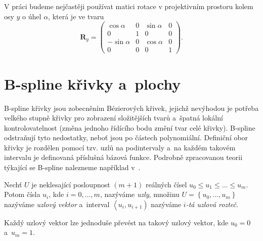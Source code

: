 \begin{poznamka}
	V práci budeme nejčastěji používat matici rotace v projektivním prostoru kolem osy $y$ o úhel $\alpha$, která je ve tvaru
	\begin{equation}\label{rotace}
		\mathbf{R}_y=
		\begin{pmatrix}
		\cos\alpha & 0 & \sin\alpha & 0 \\ 
		0 & 1 & 0 & 0 \\ 
		-\sin\alpha & 0 & \cos\alpha & 0 \\ 
		0 & 0 & 0 & 1
		\end{pmatrix}.
	\end{equation}
\end{poznamka}

\section{B-spline křivky a~plochy}\label{cast22}

B-spline křivky jsou zobecněním Bézierových křivek, jejichž nevýhodou je potřeba velkého stupně křivky pro zobrazení složitějších tvarů a~špatná lokální kontrolovatelnost (změna jednoho řídícího bodu změní tvar celé křivky). B-spline odstraňují tyto nedostatky, neboť jsou po částech polynomiální. Definiční obor křivky je rozdělen pomocí tzv. uzlů na podintervaly a~na každém takovém intervalu je definovaná příslušná bázová funkce. 
Podrobně zpracovanou teorii týkající se B-spline nalezneme například v~\cite{Pieglc1997,Shenec19972014}.

\begin{definice}
	Nechť $U$ je neklesající posloupnost $\left(m+1\right)$ reálných čísel $u_0\leq u_1\leq \dots \leq u_m$. Potom čísla $u_i$, kde $i=0,\dots,m$, nazýváme \emph{uzly}, množinu $U=\left\{u_0,\dots,u_m\right\}$ nazýváme \emph{uzlový vektor} a~interval $\left\langle u_i,u_{i+1} \right)$ nazýváme \emph{$i$-tá uzlová rozteč}.
\end{definice}

\begin{poznamka}
	Každý uzlový vektor lze jednoduše převést na takový uzlový vektor, kde $u_0=0$ a~$u_m=1$.
\end{poznamka}

